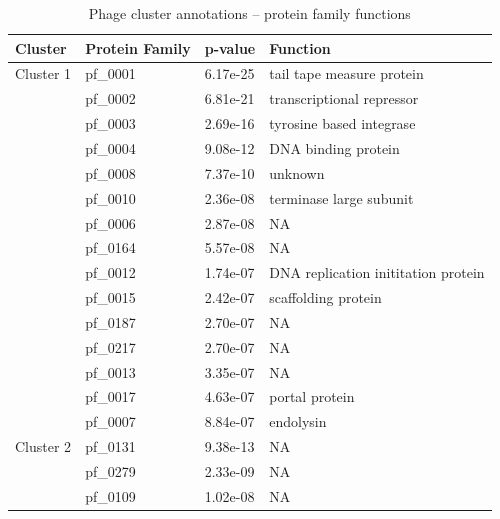 \begin{table}
    \caption{Phage cluster annotations -- protein family functions}
    \tiny

    \begin{lrbox}{\leftbox}
            \begin{tabular}[t]{llll}
            \toprule
            Cluster & Protein Family & p-value & Function \\
            \midrule
            \multirow{1}{*}{Cluster 1} & pf\_0001 & 6.17e-25 & tail tape measure protein \\ 
                                        & pf\_0002 & 6.81e-21 & transcriptional repressor \\ 
                                        & pf\_0003 & 2.69e-16 & tyrosine based integrase \\ 
                                        & pf\_0004 & 9.08e-12 & DNA binding protein \\ 
                                        & pf\_0008 & 7.37e-10 & unknown \\ 
                                        & pf\_0010 & 2.36e-08 & terminase large subunit \\ 
                                        & pf\_0006 & 2.87e-08 & NA \\ 
                                        & pf\_0164 & 5.57e-08 & NA \\ 
                                        & pf\_0012 & 1.74e-07 & DNA replication inititation protein \\ 
                                        & pf\_0015 & 2.42e-07 & scaffolding protein \\ 
                                        & pf\_0187 & 2.70e-07 & NA \\ 
                                        & pf\_0217 & 2.70e-07 & NA \\ 
                                        & pf\_0013 & 3.35e-07 & NA \\ 
                                        & pf\_0017 & 4.63e-07 & portal protein \\ 
                                        & pf\_0007 & 8.84e-07 & endolysin \\ 
            \midrule
            \multirow{1}{*}{Cluster 2} & pf\_0131 & 9.38e-13 & NA \\ 
                                        & pf\_0279 & 2.33e-09 & NA \\ 
                                        & pf\_0109 & 1.02e-08 & NA \\ 

\end{tabular}
\end{lrbox}
\end{table}
